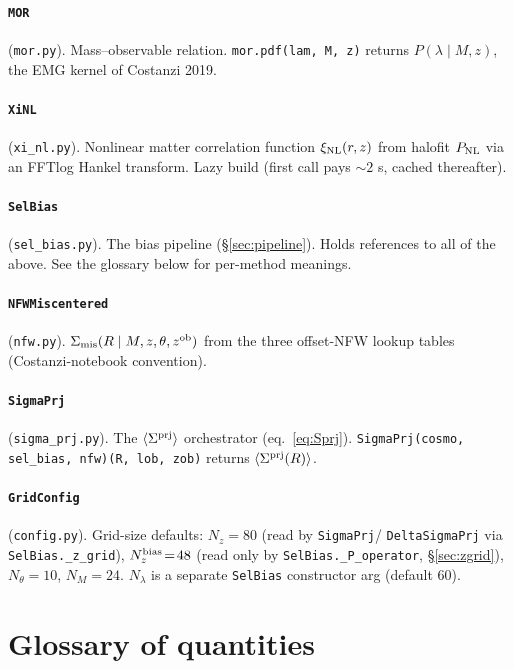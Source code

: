 \documentclass[a4paper, 11pt]{article}
\newcommand{\zob}{z^{\rm ob}}
\newcommand{\xinl}{\xi_{\rm NL}}
\newcommand{\Sprj}{\Sigma^{\rm prj}}
\newcommand{\Smis}{\Sigma_{\rm mis}}
\newcommand{\avg}[1]{\langle #1 \rangle}
\begin{document}
\paragraph{\texttt{MOR}} (\texttt{mor.py}).
Mass--observable relation. \texttt{mor.pdf(lam, M, z)} returns
\(P(\lambda\mid M,z)\), the EMG kernel of Costanzi 2019.

\paragraph{\texttt{XiNL}} (\texttt{xi\_nl.py}).
Nonlinear matter correlation function \(\xinl(r,z)\) from halofit
\(P_{\rm NL}\) via an FFTlog Hankel transform. Lazy build
(first call pays \(\sim 2\) s, cached thereafter).

\paragraph{\texttt{SelBias}} (\texttt{sel\_bias.py}).
The bias pipeline (\S\ref{sec:pipeline}). Holds references to all
of the above. See the glossary below for per-method meanings.

\paragraph{\texttt{NFWMiscentered}} (\texttt{nfw.py}).
\(\Smis(R\mid M,z,\theta,\zob)\) from the three offset-NFW lookup
tables (Costanzi-notebook convention).

\paragraph{\texttt{SigmaPrj}} (\texttt{sigma\_prj.py}).
The \(\avg{\Sprj}\) orchestrator (eq.~\ref{eq:Sprj}).
\texttt{SigmaPrj(cosmo, sel\_bias, nfw)(R, lob, zob)} returns
\(\avg{\Sprj(R)}\).

\paragraph{\texttt{GridConfig}} (\texttt{config.py}).
Grid-size defaults: \(N_z\!=\!80\) (read by \texttt{SigmaPrj}/
\texttt{DeltaSigmaPrj} via \texttt{SelBias.\_z\_grid}),
\(N_z^{\rm bias}\!=\!48\) (read only by
\texttt{SelBias.\_P\_operator}, \S\ref{sec:zgrid}), \(N_\theta\!=\!10\),
\(N_M\!=\!24\). \(N_\lambda\) is a separate \texttt{SelBias}
constructor arg (default 60).

\section{Glossary of quantities}
\label{sec:glossary}
\end{document}

